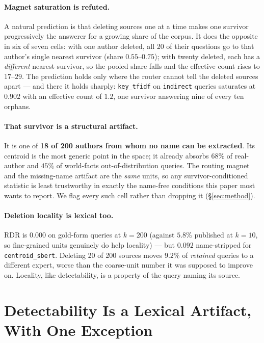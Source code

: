 \documentclass[11pt]{article}
\newcommand{\rdr}{RDR}
\begin{document}
\paragraph{Magnet saturation is refuted.} A natural prediction is that deleting sources one at a
time makes one survivor progressively the answerer for a growing share of the corpus. It does the
opposite in six of seven cells: with one author deleted, all 20 of their questions go to that
author's single nearest survivor (share $0.55$--$0.75$); with twenty deleted, each has a
\emph{different} nearest survivor, so the pooled share falls and the effective count rises to
$17$--$29$. The prediction holds only where the router cannot tell the deleted sources apart --- and
there it holds sharply: \texttt{key\_tfidf} on \texttt{indirect} queries saturates at $0.902$ with
an effective count of $1.2$, one survivor answering nine of every ten orphans.

\paragraph{That survivor is a structural artifact.} It is one of \textbf{18 of 200 authors from whom
no name can be extracted}. Its centroid is the most generic point in the space; it already absorbs
$68\%$ of real-author and $45\%$ of world-facts out-of-distribution queries. The routing magnet and
the missing-name artifact are the \emph{same} units, so any survivor-conditioned statistic is least
trustworthy in exactly the name-free conditions this paper most wants to report. We flag every such
cell rather than dropping it (\S\ref{sec:method}).

\paragraph{Deletion locality is lexical too.} \rdr{} is $0.000$ on gold-form queries at $k=200$
(against $5.8\%$ published at $k=10$, so fine-grained units genuinely do help locality) --- but
$0.092$ name-stripped for \texttt{centroid\_sbert}. Deleting 20 of 200 sources moves $9.2\%$ of
\emph{retained} queries to a different expert, worse than the coarse-unit number it was supposed to
improve on. Locality, like detectability, is a property of the query naming its source.

\section{Detectability Is a Lexical Artifact, With One Exception}
\label{sec:detect}
\end{document}
